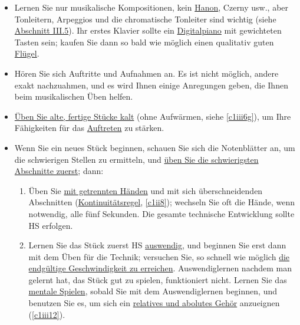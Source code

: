 \begin{itemize} 
\item Lernen Sie nur musikalische Kompositionen, kein \hyperref[c1iii7h]{Hanon}, Czerny usw., aber Tonleitern, Arpeggios und die chromatische Tonleiter sind wichtig (siehe \hyperref[c1iii5a]{Abschnitt III.5}).
Ihr erstes Klavier sollte ein \hyperref[c1iii17b]{Digitalpiano} mit gewichteten Tasten sein; kaufen Sie dann so bald wie möglich einen qualitativ guten \hyperref[c1iii17d]{Flügel}.

\item Hören Sie sich Auftritte und Aufnahmen an.
Es ist nicht möglich, andere exakt nachzuahmen, und es wird Ihnen einige Anregungen geben, die Ihnen beim musikalischen Üben helfen.

\item \hyperref[c1iii6g]{Üben Sie alte, fertige Stücke kalt} (ohne Aufwärmen, siehe \autoref{c1iii6g}), um Ihre Fähigkeiten für das \hyperref[c1iii14]{Auftreten} zu stärken.

\item Wenn Sie ein neues Stück beginnen, schauen Sie sich die Notenblätter an, um die schwierigen Stellen zu ermitteln, und \hyperref[c1ii5]{üben Sie die schwierigsten Abschnitte zuerst}; dann:

 \begin{enumerate}[label={\alph*.}] 
 \item Üben Sie \hyperref[c1ii7]{mit getrennten Händen} und mit sich überschneidenden Abschnitten (\hyperref[c1ii8]{Kontinuitätsregel}, \autoref{c1ii8}); wechseln Sie oft die Hände, wenn notwendig, alle fünf Sekunden.
Die gesamte technische Entwicklung sollte HS erfolgen.
 
 \item Lernen Sie das Stück zuerst HS \hyperref[c1iii6]{auswendig}, und beginnen Sie erst dann mit dem Üben für die Technik; versuchen Sie, so schnell wie möglich \hyperref[c1iii7i]{die endgültige Geschwindigkeit zu erreichen}.
Auswendiglernen nachdem man gelernt hat, das Stück gut zu spielen, funktioniert nicht.
Lernen Sie das \hyperref[c1ii12mental]{mentale Spielen}, sobald Sie mit dem Auswendiglernen beginnen, und benutzen Sie es, um sich ein \hyperref[c1iii12]{relatives und abolutes Gehör} anzueignen (\autoref{c1iii12}).
 

\end{enumerate}
\end{itemize}
